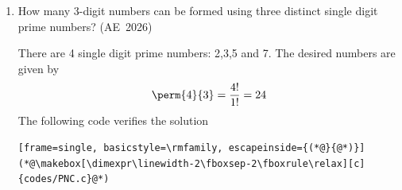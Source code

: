 \begin{enumerate}[label=\thesubsection.\arabic*, ref=\thesubsection.\theenumi]
	\item 
How many 3-digit numbers can be formed using three distinct single digit prime numbers?
\hfill (AE~2026)
\begin{enumerate}
	\begin{multicols}{4}
    \item $64$
    \item $24$
    \item $12$
    \item $4$
\end{multicols}
\end{enumerate} 
\solution
There are 4 single digit prime numbers: 2,3,5 and 7. The desired numbers are given by
 \begin{align}
	 \perm{4}{3} = \frac{4!}{1!} = 24
 \end{align}
The following code verifies the solution
\begin{lstlisting}[frame=single, basicstyle=\rmfamily, escapeinside={(*@}{@*)}]
(*@\makebox[\dimexpr\linewidth-2\fboxsep-2\fboxrule\relax][c]{codes/PNC.c}@*)
\end{lstlisting}


\end{enumerate}
